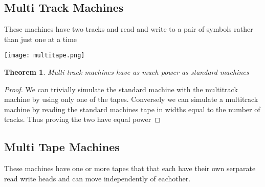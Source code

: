 \documentclass[11pt]{exam}
\newtheorem{theorem}{Theorem}[section]
\begin{document}
\subsection{Multi Track Machines}
These machines have two tracks and read and write to a pair of symbols
rather than just one at a time\\

\begin{center}
\texttt{[image: multitape.png]}
\end{center}

\begin{theorem}
Multi track machines have as much power as standard machines
\end{theorem}
\begin{proof}
We can trivially simulate the standard machine with the multitrack machine by using only one of the tapes. Conversely we can simulate a multitrack machine by reading the standard machines tape in widths equal to the number of tracks. Thus proving the two have equal power
\end{proof}


\subsection{Multi Tape Machines}
These machines have one or more tapes that that each have their own serparate read write heads and can move independently of eachother. \\
\end{document}
